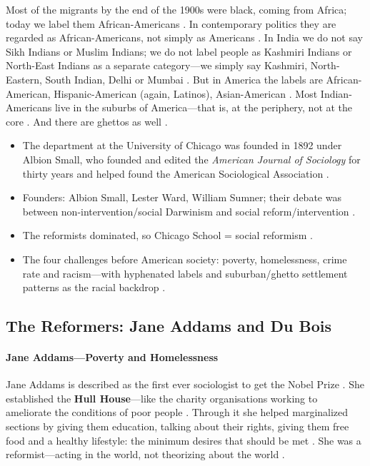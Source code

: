 Most of the migrants by the end of the 1900s were black, coming from Africa; today we label them African-Americans . In contemporary politics they are regarded as African-Americans, not simply as Americans .
In India we do not say Sikh Indians or Muslim Indians; we do not label people as Kashmiri Indians or North-East Indians as a separate category---we simply say Kashmiri, North-Eastern, South Indian, Delhi or Mumbai .
But in America the labels are African-American, Hispanic-American (again, Latinos), Asian-American . Most Indian-Americans live in the suburbs of America---that is, at the periphery, not at the core . And there are ghettos as well .

\begin{QuickRevision}
\begin{itemize}
    \item The department at the University of Chicago was founded in 1892 under Albion Small, who founded and edited the \textit{American Journal of Sociology} for thirty years and helped found the American Sociological Association .
    \item Founders: Albion Small, Lester Ward, William Sumner; their debate was between non-intervention/social Darwinism and social reform/intervention .
    \item The reformists dominated, so Chicago School = social reformism .
    \item The four challenges before American society: poverty, homelessness, crime rate and racism---with hyphenated labels and suburban/ghetto settlement patterns as the racial backdrop .
\end{itemize}
\end{QuickRevision}

\subsection{The Reformers: Jane Addams and Du Bois}

\paragraph{Jane Addams---Poverty and Homelessness}
Jane Addams is described as the first ever sociologist to get the Nobel Prize .
She established the \textbf{Hull House}---like the charity organisations working to ameliorate the conditions of poor people . Through it she helped marginalized sections by giving them education, talking about their rights, giving them free food and a healthy lifestyle: the minimum desires that should be met . She was a reformist---acting in the world, not theorizing about the world .

